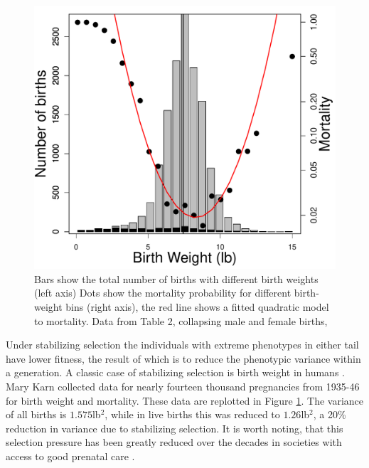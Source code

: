 
\begin{figure}
\begin{center}
\includegraphics[width= 0.6 \textwidth]{Journal_figs/Quant_gen/birth_weight/Karn_Penrose_birth_weight.pdf}
\end{center}
\caption{Bars show the total number of births with different birth
  weights (left axis)  Dots show the mortality probability for different
  birth-weight bins (right axis), the red line shows a fitted
  quadratic model to mortality. Data from \citet{karn1951birth}
  Table 2, collapsing male and female births,  } \label{fig:Birth_weight}  
\end{figure}

Under stabilizing selection the individuals with extreme phenotypes in
either tail have lower fitness, the result of which is to reduce the
phenotypic variance within a generation. A classic case of stabilizing selection
is birth weight in humans \citep{karn1951birth}. Mary Karn collected
data for nearly fourteen thousand pregnancies from 1935-46 for birth
weight and mortality. These data are replotted in Figure
\ref{fig:Birth_weight}. The variance of all births is $1.575$lb$^2$, while in live births this
was reduced to $1.26$lb$^2$, a 20\% reduction in variance due to
stabilizing selection. It is worth noting, that this selection
pressure has been greatly reduced over the decades in societies with
access to good prenatal care \citep{ulizzi1992natural}.  %


